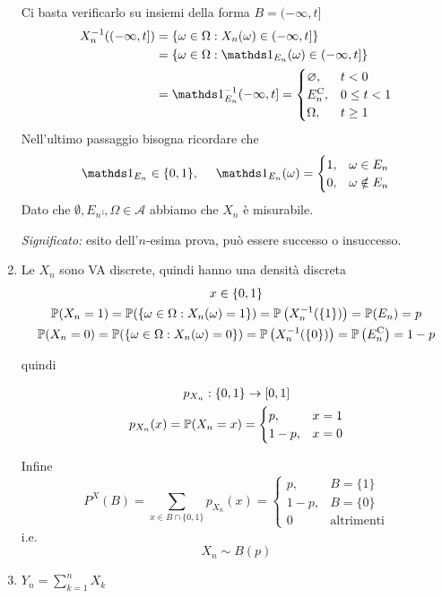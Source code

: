 \begin{enumerate}
Ci basta verificarlo su insiemi della forma $B=( -\infty ,t]$
\begin{align*}
X_{n}^{-1}((-\infty ,t]) & =\{\omega \in \Omega :X_{n}(\omega) \in ( -\infty ,t]\}\\
 & =\{\omega \in \Omega :\Ind_{E_{n}}(\omega) \in ( -\infty ,t]\}\\
 & =\Ind_{E_{n}}^{-1}( -\infty ,t] =
\begin{cases}
\emptyset , & t< 0\\
E_{n}\comp , & 0\leq t< 1\\
\Omega , & t\geq 1
\end{cases}
\end{align*}
Nell'ultimo passaggio bisogna ricordare che
\begin{equation*}
\Ind_{E_{n}} \in \{0,1\} ,\ \ \ \ \Ind_{E_{n}}(\omega) =
\begin{cases}
1, & \omega \in E_{n}\\
0, & \omega \notin E_{n}
\end{cases}
\end{equation*}
Dato che $\emptyset ,E_{n}\comp ,\Omega \in \mathcal{A}$ abbiamo che $X_{n}$ è misurabile.

\textit{Significato:} esito dell'$n$-esima prova, può essere successo o insuccesso.
\item Le $X_{n}$ sono VA discrete, quindi hanno una densità discreta
\begin{gather*}
x\in \{0,1\}\\
\mathbb{P}(X_{n} =1) =\mathbb{P}(\{\omega \in \Omega :X_{n}(\omega) =1\}) =\mathbb{P}\left(X_{n}^{-1}(\{1\})\right) =\mathbb{P}(E_{n}) =p\\
\mathbb{P}(X_{n} =0) =\mathbb{P}(\{\omega \in \Omega :X_{n}(\omega) =0\}) =\mathbb{P}\left(X_{n}^{-1}(\{0\})\right) =\mathbb{P}\left(E_{n}^{\mathrm{C}}\right) =1-p
\end{gather*}

quindi

\begin{gather*}
p_{X_{n}} :\{0,1\}\rightarrow [0,1]\\
p_{X_{n}}(x) =\mathbb{P}(X_{n} =x) =
\begin{cases}
p, & x=1\\
1-p, & x=0
\end{cases}
\end{gather*}

Infine
\begin{equation*}
P^{X}(B) =\sum\limits_{x\in B\cap \{0,1\}} p_{X_{n}}(x) =
\begin{cases}
p, & B=\{1\}\\
1-p, & B=\{0\}\\
0 & \text{altrimenti}
\end{cases}
\end{equation*}
i.e.
\begin{equation*}
\boxed{X_{n} \sim B(p)}
\end{equation*}
\item $Y_{n} =\sum\limits_{k=1}^{n} X_{k}$


\end{enumerate}
